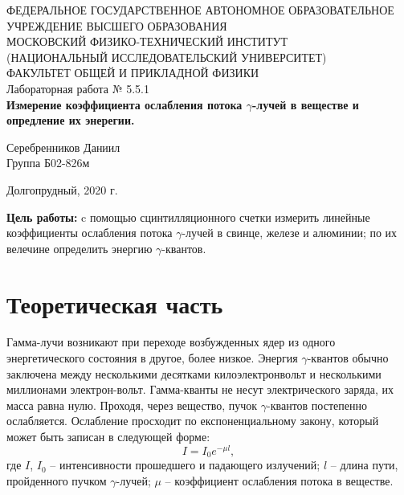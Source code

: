 \documentclass[a4paper,12pt]{article} %
\begin{document}
\begin{center}
	\footnotesize{ФЕДЕРАЛЬНОЕ ГОСУДАРСТВЕННОЕ АВТОНОМНОЕ ОБРАЗОВАТЕЛЬНОЕ 			УЧРЕЖДЕНИЕ ВЫСШЕГО ОБРАЗОВАНИЯ}\\
	\footnotesize{МОСКОВСКИЙ ФИЗИКО-ТЕХНИЧЕСКИЙ ИНСТИТУТ\\(НАЦИОНАЛЬНЫЙ 			ИССЛЕДОВАТЕЛЬСКИЙ УНИВЕРСИТЕТ)}\\
	\footnotesize{ФАКУЛЬТЕТ ОБЩЕЙ И ПРИКЛАДНОЙ ФИЗИКИ\\}
	\hfill \break
	\hfill\break
	\hfill\break
	\hfill \break
	\hfill \break
	\hfill \break
	\hfill \break
	\hfill \break
	\hfill \break
	\hfill \break
	\hfill \break
	\hfill \break
	\hfill \break
	\hfill \break
	\large{Лабораторная работа № 5.5.1 \\\textbf{Измерение коэффициента ослабления потока $\gamma$-лучей в веществе и опредление их энерегии.}}\\
	\hfill \break
	\hfill \break
	\hfill \break
	\begin{flushright}
		Серебренников Даниил\\
		Группа Б02-826м
	\end{flushright}
	\hfill \break
	\hfill \break
	\hfill \break
	\hfill \break
	\hfill \break
	\hfill \break
	\hfill \break
	\hfill \break
	\hfill \break
	\hfill \break
	\hfill \break
\end{center}
\begin{center}
	Долгопрудный, 2020 г.
\end{center}
\thispagestyle{empty}
\newpage
	\textbf{Цель работы:} c помощью сцинтилляционного счетки измерить линейные коэффициенты ослабления потока $\gamma$-лучей в свинце, железе и алюминии; по их велечине определить энергию $\gamma$-квантов.

\section{Теоретическая часть}
	Гамма-лучи возникают при переходе возбужденных ядер из одного энергетического состояния в другое, более низкое. Энергия $\gamma$-квантов обычно заключена между несколькими десятками килоэлектронвольт и несколькими миллионами электрон-вольт. Гамма-кванты не несут электрического заряда, их масса равна нулю. Проходя, через вещество, пучок $\gamma$-квантов постепенно ослабляется. Ослабление просходит по експоненциальному закону, который может быть записан в следующей форме:
	\begin{equation}
		\label{eq1}
		I = I_0 e^{-\mu l},
	\end{equation}
	где $I$, $I_0$ -- интенсивности прошедшего и падающего излучений; $l$ -- длина пути, пройденного пучком $\gamma$-лучей; $\mu$ -- коэффициент ослабления потока в веществе.
	
\end{document}
